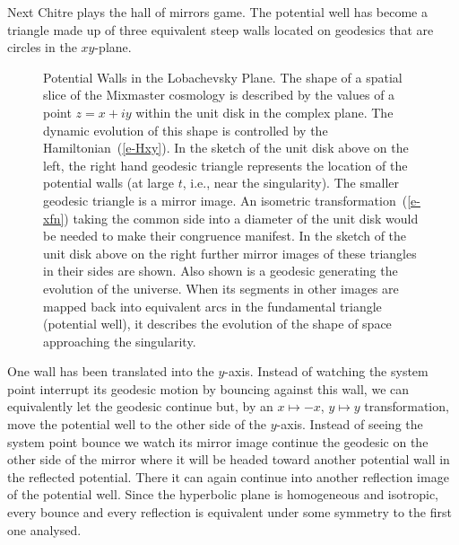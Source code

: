 Next Chitre plays the hall of mirrors game.  The potential well has
become a triangle made up of three equivalent steep walls located on
geodesics that are circles in the $xy$-plane.
\begin{figure}[tb]
\vspace*{2in}
\caption[Potential Walls in the Lobachevsky Plane.]{
Potential Walls in the Lobachevsky Plane.  The shape of a spatial
slice of the Mixmaster cosmology is described by the values of a
point $z = x+iy$ within the unit disk in the complex plane.  The
dynamic evolution of this shape is controlled by the
Hamiltonian~(\protect\ref{e-Hxy}). In the sketch of the unit disk
above on the left, the right hand geodesic triangle represents the
location of the potential walls (at large $t$, i.e., near the
singularity). The smaller geodesic triangle is a mirror image.  An
isometric transformation~(\protect\ref{e-xfn}) taking the common side
into a diameter of the unit disk would be needed to make their
congruence manifest.  In the sketch of the unit disk above on the
right further mirror images of these triangles in their sides are
shown. Also shown is a geodesic generating the evolution of the
universe.  When its segments in other images are mapped back into
equivalent arcs in the fundamental triangle (potential well), it
describes the evolution of the shape of space approaching the
singularity.}
\end{figure}
One wall has been translated into the $y$-axis.  Instead of watching
the system point interrupt its geodesic motion by bouncing against
this wall, we can equivalently let the geodesic continue but, by an
$x \mapsto -x$, $y \mapsto y$ transformation, move the potential well
to the other side of the $y$-axis.  Instead of seeing the system
point bounce we watch its mirror image continue the geodesic on the
other side of the mirror where it will be headed toward another
potential wall in the reflected potential.  There it can again
continue into another reflection image of the potential well.  Since
the hyperbolic plane is homogeneous and isotropic, every bounce and
every reflection is equivalent under some symmetry to the first one
analysed.

